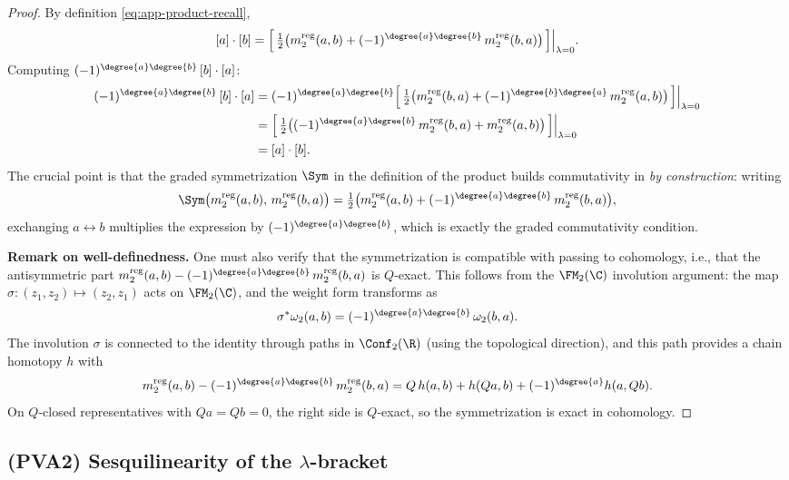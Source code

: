 \begin{proof}
By definition \eqref{eq:app-product-recall},
\[
[a]\cdot[b] = \Bigl[\,\tfrac{1}{2}\bigl(m_2^{\mathrm{reg}}(a,b) + (-1)^{\degree{a}\degree{b}}\,m_2^{\mathrm{reg}}(b,a)\bigr)\,\Bigr]\Big|_{\lambda=0}.
\]
Computing $(-1)^{\degree{a}\degree{b}}\,[b]\cdot[a]$:
\begin{align*}
(-1)^{\degree{a}\degree{b}}\,[b]\cdot[a]
&= (-1)^{\degree{a}\degree{b}}\Bigl[\,\tfrac{1}{2}\bigl(m_2^{\mathrm{reg}}(b,a) + (-1)^{\degree{b}\degree{a}}\,m_2^{\mathrm{reg}}(a,b)\bigr)\,\Bigr]\Big|_{\lambda=0}\\
&= \Bigl[\,\tfrac{1}{2}\bigl((-1)^{\degree{a}\degree{b}}\,m_2^{\mathrm{reg}}(b,a) + m_2^{\mathrm{reg}}(a,b)\bigr)\,\Bigr]\Big|_{\lambda=0}\\
&= [a]\cdot[b].
\end{align*}
The crucial point is that the graded symmetrization $\Sym$ in the definition of the product builds commutativity in \emph{by construction}: writing
\[
\Sym\bigl(m_2^{\mathrm{reg}}(a,b),\,m_2^{\mathrm{reg}}(b,a)\bigr) = \tfrac{1}{2}\bigl(m_2^{\mathrm{reg}}(a,b) + (-1)^{\degree{a}\degree{b}}\,m_2^{\mathrm{reg}}(b,a)\bigr),
\]
exchanging $a\leftrightarrow b$ multiplies the expression by $(-1)^{\degree{a}\degree{b}}$, which is exactly the graded commutativity condition.

\smallskip

\noindent\textbf{Remark on well-definedness.} One must also verify that the symmetrization is compatible with passing to cohomology, i.e., that the antisymmetric part $m_2^{\mathrm{reg}}(a,b) - (-1)^{\degree{a}\degree{b}}\,m_2^{\mathrm{reg}}(b,a)$ is $Q$-exact. This follows from the $\FM_2(\C)$ involution argument: the map $\sigma: (z_1,z_2)\mapsto (z_2,z_1)$ acts on $\FM_2(\C)$, and the weight form transforms as
\[
\sigma^*\omega_2(a,b) = (-1)^{\degree{a}\degree{b}}\,\omega_2(b,a).
\]
The involution $\sigma$ is connected to the identity through paths in $\Conf_2(\R)$ (using the topological direction), and this path provides a chain homotopy $h$ with
\[
m_2^{\mathrm{reg}}(a,b) - (-1)^{\degree{a}\degree{b}}\,m_2^{\mathrm{reg}}(b,a) = Q\,h(a,b) + h(Qa,b) + (-1)^{\degree{a}} h(a,Qb).
\]
On $Q$-closed representatives with $Qa = Qb = 0$, the right side is $Q$-exact, so the symmetrization is exact in cohomology.
\end{proof}

\subsection{(PVA2) Sesquilinearity of the $\lambda$-bracket}

